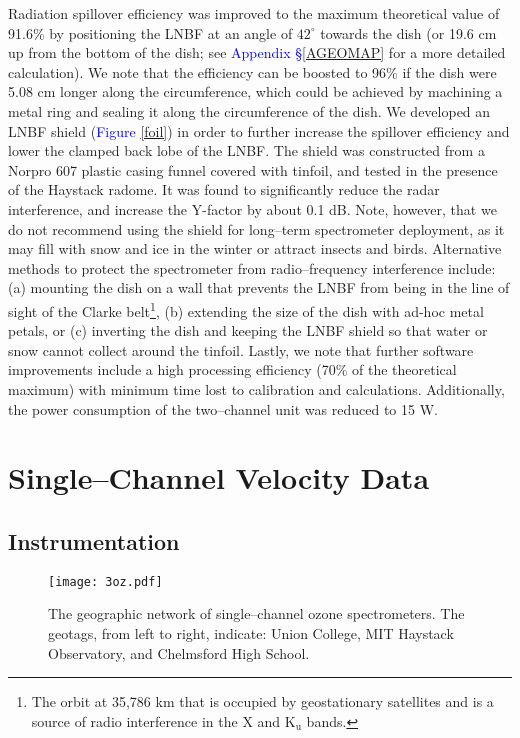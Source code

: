 \documentclass[11pt]{article}
\begin{document}
Radiation spillover efficiency was improved to the maximum theoretical value of 91.6\% by positioning the LNBF at an angle of $42^\circ$ towards the dish (or 19.6 cm up from the bottom of the dish; see \textcolor{blue}{Appendix \S\ref{AGEOMAP}} for a more detailed calculation). We note that the efficiency can be boosted to 96\% if the dish were 5.08 cm longer along the circumference, which could be achieved by machining a metal ring and sealing it along the circumference of the dish. We developed an LNBF shield (\textcolor{blue}{Figure} \ref{foil}) in order to further increase the spillover efficiency and lower the clamped back lobe of the LNBF. The shield was constructed from a Norpro 607 plastic casing funnel covered with tinfoil, and tested in the presence of the Haystack radome. It was found to significantly reduce the radar interference, and increase the Y-factor by about 0.1 dB. Note, however, that we do not recommend using the shield for long--term spectrometer deployment, as it may fill with snow and ice in the winter or attract insects and birds. Alternative methods to protect the spectrometer from radio--frequency interference include: (a) mounting the dish on a wall that prevents the LNBF from being in the line of sight of the Clarke belt\footnote{The orbit at 35,786 km that is occupied by geostationary satellites and is a source of radio interference in the X and $\text{K}_\text{u}$ bands.}, (b) extending the size of the dish with ad-hoc metal petals, or (c) inverting the dish and keeping the LNBF shield so that water or snow cannot collect around the tinfoil. Lastly, we note that further software improvements include a high processing efficiency (70\% of the theoretical maximum) with minimum time lost to calibration and calculations. Additionally, the power consumption of the two--channel unit was reduced to 15 W.	
\section{Single--Channel Velocity Data}
\subsection{Instrumentation}
	\afterpage{\clearpage}

	\begin{figure}[t]
		\centering
		\centerline{\texttt{[image: 3oz.pdf]}}
		\caption{The geographic network of single--channel ozone spectrometers. The geotags, from left to right, indicate: Union College, MIT Haystack Observatory, and Chelmsford High School.}
		\label{3oz}
	\end{figure}	
	
\end{document}
